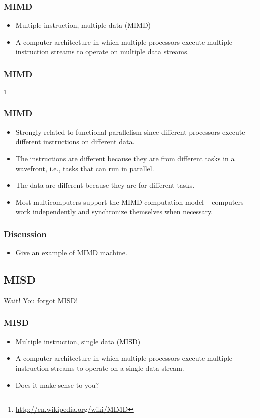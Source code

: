 \documentclass{beamer}
\begin{document}
\begin{CJK}{UTF8}{bsmi}
\begin{frame}
\frametitle{MIMD}
\begin{itemize}
\item Multiple instruction, multiple data (MIMD) 
\item A computer architecture in which multiple processors execute
  multiple instruction streams to operate on multiple data streams.
\end{itemize}
\end{frame}

\begin{frame}
\frametitle{MIMD}
\centerline{}
\footnote{\url{http://en.wikipedia.org/wiki/MIMD}}
\end{frame}

\begin{frame}
\frametitle{MIMD}
\begin{itemize}
\item Strongly related to functional parallelism since different
  processors execute different instructions on different data.
\item The instructions are different because they are from different
  tasks in a wavefront, i.e., tasks that can run in parallel.
\item The data are different because they are for different tasks.
\item Most multicomputers support the MIMD computation model -- computers work independently and synchronize themselves when necessary.
\end{itemize}
\end{frame}

\begin{frame}
\frametitle{Discussion}
\begin{itemize}
\item Give an example of MIMD machine.
\end{itemize}
\end{frame}

\subsection{MISD}

\begin{frame}
\huge Wait! You forgot MISD!
\end{frame}

\begin{frame}
\frametitle{MISD}
\begin{itemize}
\item Multiple instruction, single data (MISD) 
\item A computer architecture in which multiple processors execute
  multiple instruction streams to operate on a single data stream.
\item Does it make sense to you?
\end{itemize}
\end{frame}


\end{CJK}
\end{document}
